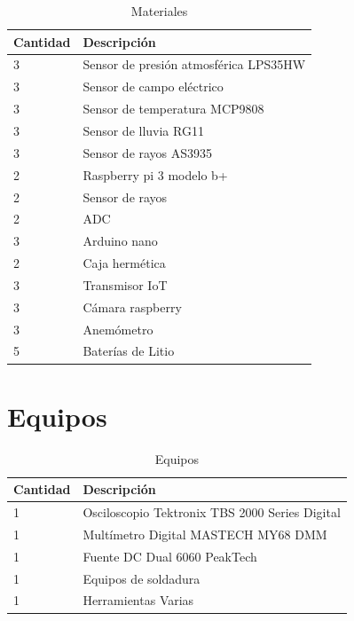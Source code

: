 \documentclass[12pt,a4paper,oneside]{book}
\begin{document}
\begin{table}[htbp]
\begin{center}
\begin{tabular}{|p{2cm}|p{7cm}|}\hline
\hline
Cantidad & Descripción\\
\hline  \hline
3 & Sensor de presión atmosférica LPS35HW\\ \hline
3 & Sensor de campo eléctrico \\ \hline
3 & Sensor de temperatura MCP9808 \\ \hline
3 & Sensor de lluvia RG11 \\ \hline
3 & Sensor de rayos AS3935 \\ \hline
2 & Raspberry pi 3 modelo b+ \\ \hline
2 & Sensor de rayos \\ \hline
2 & ADC\\ \hline
3 & Arduino nano\\ \hline
2 & Caja hermética\\ \hline
3 & Transmisor IoT\\ \hline
3 & Cámara raspberry\\ \hline
3 & Anemómetro\\ \hline
5 & Baterías de Litio\\ \hline
\end{tabular}
\caption{Materiales}
\end{center}
\end{table}
\section{\textbf{Equipos}}
\begin{table}[h!]
\begin{center}
\begin{tabular}{|p{2cm}|p{7cm}|}\hline
\hline
Cantidad & Descripción\\
\hline  \hline
1 & Osciloscopio Tektronix TBS 2000 Series Digital\\ \hline
1 & Multímetro Digital MASTECH MY68 DMM \\ \hline
1 & Fuente DC Dual 6060 PeakTech \\ \hline
1 & Equipos de soldadura \\ \hline
1 & Herramientas Varias \\ \hline
\end{tabular}
\caption{Equipos}
\end{center}
\end{table}

\newpage
\cleardoublepage
{}%


\end{document}
